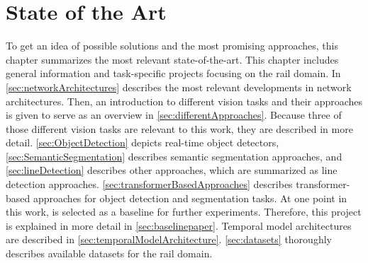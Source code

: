 \chapter{State of the Art}
\label{sec:stateOfTheArt}

To get an idea of possible solutions and the most promising approaches, this chapter summarizes the most relevant state-of-the-art.
This chapter includes general information and task-specific projects focusing on the rail domain.
In \autoref{sec:networkArchitectures} describes the most relevant developments in network architectures.
Then, an introduction to different vision tasks and their approaches is given to serve as an overview in \autoref{sec:differentApproaches}.
Because three of those different vision tasks are relevant to this work, they are described in more detail.
\autoref{sec:ObjectDetection} depicts real-time object detectors, \autoref{sec:SemanticSegmentation} describes semantic segmentation approaches, and \autoref{sec:lineDetection} describes other approaches, which are summarized as line detection approaches.
\autoref{sec:transformerBasedApproaches} describes transformer-based approaches for object detection and segmentation tasks.
At one point in this work, \cite{tepNet2024} is selected as a baseline for further experiments.
Therefore, this project is explained in more detail in \autoref{sec:baselinepaper}.
Temporal model architectures are described in \autoref{sec:temporalModelArchitecture}.
\autoref{sec:datasets} thoroughly describes available datasets for the rail domain.





\clearpage








